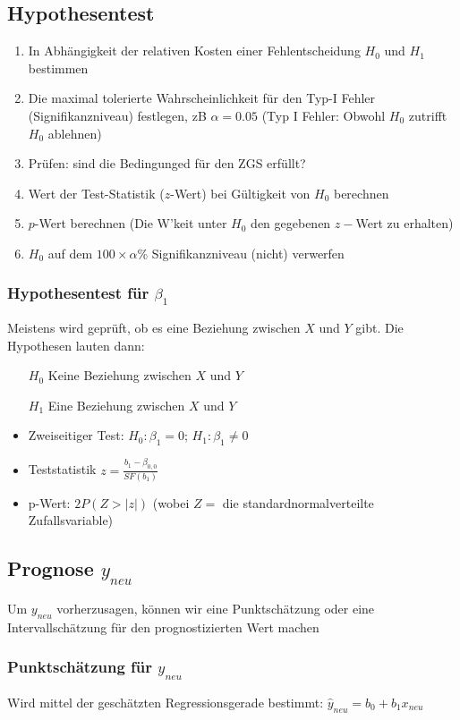 \documentclass[a3paper, 8pt]{extarticle}
\begin{document}
\begin{multicols*}{5}
\subsection{Hypothesentest}
\begin{enumerate}
    \item In Abhängigkeit der relativen Kosten einer Fehlentscheidung $H_0$ und $H_1$ bestimmen
    \item Die maximal tolerierte Wahrscheinlichkeit für den Typ-I Fehler (Signifikanzniveau) festlegen, zB $\alpha = 0.05$ (Typ I Fehler: Obwohl $H_0$ zutrifft $H_0$ ablehnen)
    \item Prüfen: sind die Bedingunged für den ZGS erfüllt?
    \item Wert der Test-Statistik ($z$-Wert) bei Gültigkeit von $H_0$ berechnen
    \item $p$-Wert berechnen (Die W'keit unter $H_0$ den gegebenen $z-$Wert zu erhalten)
    \item $H_0$ auf dem $100 \times \alpha \%$ Signifikanzniveau (nicht) verwerfen
\end{enumerate}

\subsubsection{Hypothesentest für $\beta_1$}
Meistens wird geprüft, ob es eine Beziehung zwischen $X$ und $Y$ gibt. Die Hypothesen lauten dann: \begin{itemize}
    \item[$H_0$] Keine Beziehung zwischen $X$ und $Y$
    \item[$H_1$] Eine Beziehung zwischen $X$ und $Y$
    \item Zweiseitiger Test: $H_0: \beta_1 = 0$; $H_1: \beta_1 \neq 0$
    \item Teststatistik $z=\frac{b_1-\beta_{0,0}}{SF(b_1)}$
    \item p-Wert: $2P(Z > |z|)$ (wobei $Z=$ die standardnormalverteilte Zufallsvariable)
\end{itemize}
\subsection{Prognose $y_{neu}$}
Um $y_{neu}$ vorherzusagen, können wir eine Punktschätzung oder eine Intervallschätzung für den prognostizierten Wert machen

\subsubsection{Punktschätzung für $y_{neu}$} Wird mittel der geschätzten Regressionsgerade bestimmt: $\hat{y}_{neu}=b_0+b_1 x_{neu}$


\end{multicols*}
\end{document}
